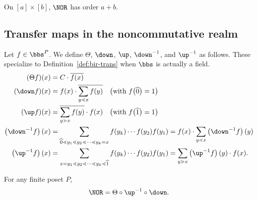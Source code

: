 \begin{conj}\label{conj:NOR-prod-chains}
On $[a]\times[b]$, $\NOR$ has order $a+b$.
\end{conj}

\subsection{Transfer maps in the noncommutative realm}

\begin{defi}
Let $f\in\bbs^P$. We define  $\Theta$,  $\down$,  $\up$,  $\down^{-1}$, and 
$\up^{-1}$ 
as follows. 
These specialize to Definition~\ref{def:bir-trans} when $\bbs$ is actually a field.
\begin{align*}
 (\Theta f)(x) &= C \cdot \overline{f(x)}\\
 (\down f)(x) &= f(x) \cdot \overline{\sum\limits_{y\lessdot x}f(y)} \quad \big(\text{with } f\big(\widehat{0}\big)=1\big)\\
 (\up f)(x) &= 
 \overline{\sum\limits_{y\gtrdot x}f(y)} \cdot f(x) \quad \big(\text{with } f\big(\widehat{1}\big)=1\big)\\
 \left(\down^{-1}f\right)(x) &=
 \sum_{\widehat{0}\lessdot y_1\lessdot y_2 \lessdot \cdots \lessdot y_k=x} f(y_k)\cdots f(y_2)f(y_1) 
 =f(x) \cdot \sum\limits_{y\lessdot x}\left(\down^{-1}f\right)(y)\\
 \left(\up^{-1}f\right)(x) &=
 \sum_{x=y_1\lessdot y_2 \lessdot \cdots \lessdot y_k\lessdot \widehat{1}} f(y_k)\cdots f(y_2)f(y_1)
 =\sum\limits_{y\gtrdot x}\left(\up^{-1}f\right)(y) \cdot f(x).
\end{align*}
\end{defi}

\begin{theo}\label{thm:NOR-transfer}
For any finite poset $P$, 
\[
\NOR=\Theta \circ \up^{-1} \circ \down.
\]
\end{theo}

